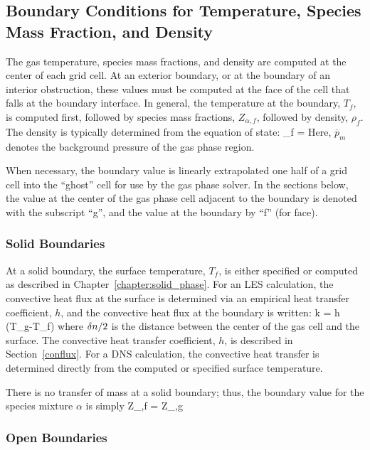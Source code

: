 \subsection{Boundary Conditions for Temperature, Species Mass Fraction, and Density}

The gas temperature, species mass fractions, and density are computed at the center of each grid cell. At an exterior boundary, or at
the boundary of an interior obstruction, these values must be computed at the face of the cell that falls at the boundary interface. In general, the temperature at the boundary, $T_f$, is
computed first, followed by species mass fractions, $Z_{\alpha,f}$, followed by density, $\rho_f$. The density is typically determined from the equation of state:
\be  \rho_f =   \ee 
Here, $\overline{p}_m$ denotes the background pressure of the gas phase region.

When necessary, the boundary value is linearly extrapolated one half
of a grid cell into the ``ghost'' cell for use by the gas phase solver. In the sections below, the value at the center of the gas phase cell
adjacent to the boundary is denoted with the subscript ``g'', and the value at the boundary by ``f'' (for face).

\subsubsection{Solid Boundaries}

At a solid boundary, the surface temperature, $T_f$, is either specified or computed as described in Chapter~\ref{chapter:solid_phase}.
For an LES calculation, the convective heat flux at the surface is determined via an empirical heat transfer coefficient, $h$, and the convective heat flux at the boundary is written:
\be k  = h \; (T_g-T_f)  \label{ebal} \ee
where $\delta n/2$ is the distance between the center of the gas cell
and the surface. The convective heat transfer coefficient, $h$, is described in Section~\ref{conflux}. For a DNS calculation, the convective 
heat transfer is determined directly from the computed or specified surface temperature.

There is no transfer of mass at a solid boundary; thus, the boundary value for the species mixture $\alpha$ is simply
\be Z_{\alpha,f} = Z_{\alpha,g} \ee

\subsubsection{Open Boundaries}

